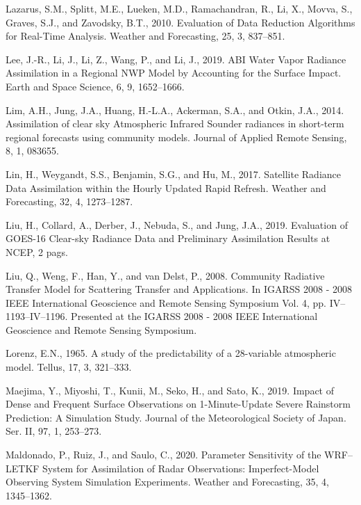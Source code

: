 \documentclass[12pt,oneside,a4paper]{reedthesis}
\begin{document}
\leavevmode\hypertarget{ref-lazarus2010}{}%
Lazarus, S.M., Splitt, M.E., Lueken, M.D., Ramachandran, R., Li, X., Movva, S., Graves, S.J., and Zavodsky, B.T., 2010. Evaluation of Data Reduction Algorithms for Real-Time Analysis. Weather and Forecasting, 25, 3, 837--851.

\leavevmode\hypertarget{ref-lee2019}{}%
Lee, J.-R., Li, J., Li, Z., Wang, P., and Li, J., 2019. ABI Water Vapor Radiance Assimilation in a Regional NWP Model by Accounting for the Surface Impact. Earth and Space Science, 6, 9, 1652--1666.

\leavevmode\hypertarget{ref-lim2014}{}%
Lim, A.H., Jung, J.A., Huang, H.-L.A., Ackerman, S.A., and Otkin, J.A., 2014. Assimilation of clear sky Atmospheric Infrared Sounder radiances in short-term regional forecasts using community models. Journal of Applied Remote Sensing, 8, 1, 083655.

\leavevmode\hypertarget{ref-lin2017a}{}%
Lin, H., Weygandt, S.S., Benjamin, S.G., and Hu, M., 2017. Satellite Radiance Data Assimilation within the Hourly Updated Rapid Refresh. Weather and Forecasting, 32, 4, 1273--1287.

\leavevmode\hypertarget{ref-liu2019}{}%
Liu, H., Collard, A., Derber, J., Nebuda, S., and Jung, J.A., 2019. Evaluation of GOES-16 Clear-sky Radiance Data and Preliminary Assimilation Results at NCEP, 2 pags.

\leavevmode\hypertarget{ref-liu2008}{}%
Liu, Q., Weng, F., Han, Y., and van Delst, P., 2008. Community Radiative Transfer Model for Scattering Transfer and Applications. In IGARSS 2008 - 2008 IEEE International Geoscience and Remote Sensing Symposium Vol. 4, pp. IV--1193--IV--1196. Presented at the IGARSS 2008 - 2008 IEEE International Geoscience and Remote Sensing Symposium.

\leavevmode\hypertarget{ref-lorenz1965}{}%
Lorenz, E.N., 1965. A study of the predictability of a 28-variable atmospheric model. Tellus, 17, 3, 321--333.

\leavevmode\hypertarget{ref-maejima2019}{}%
Maejima, Y., Miyoshi, T., Kunii, M., Seko, H., and Sato, K., 2019. Impact of Dense and Frequent Surface Observations on 1-Minute-Update Severe Rainstorm Prediction: A Simulation Study. Journal of the Meteorological Society of Japan. Ser. II, 97, 1, 253--273.

\leavevmode\hypertarget{ref-maldonado2020}{}%
Maldonado, P., Ruiz, J., and Saulo, C., 2020. Parameter Sensitivity of the WRF--LETKF System for Assimilation of Radar Observations: Imperfect-Model Observing System Simulation Experiments. Weather and Forecasting, 35, 4, 1345--1362.
\end{document}
